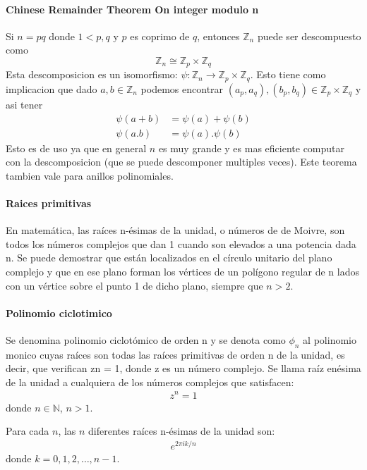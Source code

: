 \documentclass[12pt, oneside]{article}
\newcommand{\Z}{\mathbb{Z}}
\newcommand{\N}{\mathbb{N}}
\begin{document}
\paragraph{Chinese Remainder Theorem On integer modulo n}
Si $n=pq$  donde $1<p,q$ y $p$ es coprimo de $q$, entonces $\Z_n$ puede ser descompuesto como
\begin{equation*}
  \Z_n \cong \Z_p\times \Z_q
\end{equation*}
Esta descomposicion es un isomorfismo: $\psi:\Z_n\to\Z_p\times\Z_q$.
Esto tiene como implicacion que dado $a,b \in\Z_n$ podemos encontrar $(a_p,a_q),(b_p,b_q)\in\Z_p\times\Z_q$
y asi tener
\begin{align}
  \psi(a+b)&=\psi(a)+\psi(b)\\
  \psi(a.b)&=\psi(a).\psi(b)
\end{align}
Esto es de uso ya que en general $n$ es muy grande y es mas eficiente
computar con la descomposicion (que se puede descomponer multiples veces).
Este teorema tambien vale para anillos polinomiales.

\paragraph{Raices primitivas}
En matemática, las raíces n-ésimas de la unidad, o números de de Moivre,
son todos los números complejos que dan 1 cuando son elevados a una potencia dada n.
Se puede demostrar que están localizados en el círculo unitario del plano complejo y
que en ese plano forman los vértices de un polígono regular de n lados con un vértice
sobre el punto 1 de dicho plano, siempre que $n>2$.

\paragraph{Polinomio ciclotimico}
Se denomina polinomio ciclotómico de orden n y se denota como $\phi_n$ al
polinomio monico cuyas raíces son todas las raíces primitivas de orden n de la unidad,
es decir, que verifican zn = 1, donde z es un número complejo.
Se llama raíz enésima de la unidad a cualquiera de los números complejos que
satisfacen:
\begin{align*}
  z^{n}=1
\end{align*}
donde $n\in\N$, $n>1$.

Para cada $n$, las $n$ diferentes raíces n-ésimas de la unidad son:
\begin{align*}
  e^{2\pi ik/n}
\end{align*}
 donde $k=0,1,2,\dots ,n-1$.
\end{document}
